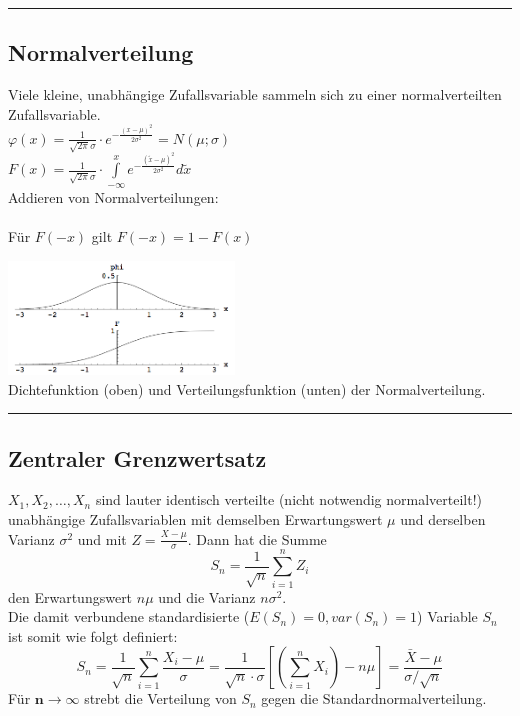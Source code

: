 \hrule
	\subsection{Normalverteilung }
    \begin{minipage}{10cm}
    Viele kleine, unabhängige Zufallsvariable sammeln sich zu einer
    normalverteilten Zufallsvariable.\\
    $\varphi(x)=\frac{1}{\sqrt{2
    \pi}\sigma}\cdot e^{-\frac{(x-\mu)^2}{2\sigma^2}} = N(\mu ; \sigma) $\\ 
    $F(x)=\frac{1}{\sqrt{2\pi}\sigma}\cdot \int\limits^{x}_{-\infty}{e^{-\frac{(\tilde{x} -\mu)^2}{2\sigma^2}}} d\tilde{x} $ \\
    Addieren von Normalverteilungen: \\
     \\
    Für $F(-x)$ gilt $F(-x) = 1 - F(x)$
  	\end{minipage}
	\begin{minipage}{8cm}
      \includegraphics[width=6cm]{./bilder/normalverteilung.png}\\
		Dichtefunktion (oben) und Verteilungsfunktion (unten) der
		Normalverteilung.
   	\end{minipage}
	\hrule
  
	\subsection{Zentraler Grenzwertsatz }
    $X_1, X_2, \ldots , X_n$ sind lauter identisch verteilte (nicht notwendig normalverteilt!)
    unabhängige Zufallsvariablen mit demselben Erwartungswert $\mu$ und derselben Varianz $\sigma^2$
    und mit $Z = \frac{X-\mu}{\sigma}$. Dann hat die Summe
    \begin{equation}
      S_n = \frac{1}{\sqrt{n}}\sum_{i=1}^n Z_i \nonumber
    \end{equation}
    den Erwartungswert $n \mu$ und die Varianz $n \sigma^2$.\\
    Die damit verbundene standardisierte ($E(S_n) = 0, var(S_n) = 1$) Variable $S_n$ ist somit wie
    folgt definiert: \\ 
    \begin{equation}
      S_n = \frac{1}{\sqrt{n}}\sum_{i=1}^n \frac{X_i - \mu}{\sigma}
      = \frac{1}{\sqrt{n}\cdot \sigma}\left[\left(\sum\limits_{i=1}^n X_i\right) -n \mu\right]
      =\dfrac{\bar{X} - \mu}{\sigma / \sqrt{n}} \nonumber
    \end{equation}
    Für $\boldsymbol{n \to \infty}$ strebt die Verteilung von $S_n$ gegen die
    Standardnormalverteilung. \\


